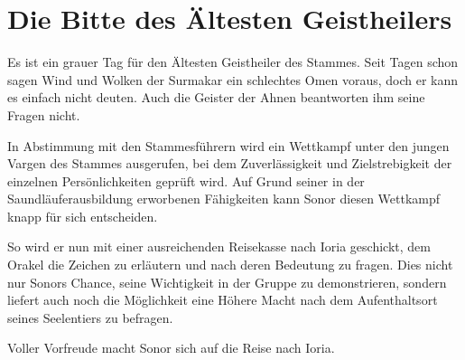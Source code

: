 \section{Die Bitte des Ältesten Geistheilers}
Es ist ein grauer Tag für den Ältesten Geistheiler des Stammes. Seit Tagen schon sagen Wind und Wolken der Surmakar ein schlechtes Omen voraus, doch er kann es einfach nicht deuten. Auch die Geister der Ahnen beantworten ihm seine Fragen nicht.

In Abstimmung mit den Stammesführern wird ein Wettkampf unter den jungen Vargen des Stammes ausgerufen, bei dem Zuverlässigkeit und Zielstrebigkeit der einzelnen Persönlichkeiten geprüft wird. 
Auf Grund seiner in der Saundläuferausbildung erworbenen Fähigkeiten kann Sonor diesen Wettkampf knapp für sich entscheiden.

So wird er nun mit einer ausreichenden Reisekasse nach Ioria geschickt, dem Orakel die Zeichen zu erläutern und nach deren Bedeutung zu fragen.
Dies nicht nur Sonors Chance, seine Wichtigkeit in der Gruppe zu demonstrieren, sondern liefert auch noch die Möglichkeit eine Höhere Macht nach dem Aufenthaltsort seines Seelentiers zu befragen.

Voller Vorfreude macht Sonor sich auf die Reise nach Ioria.